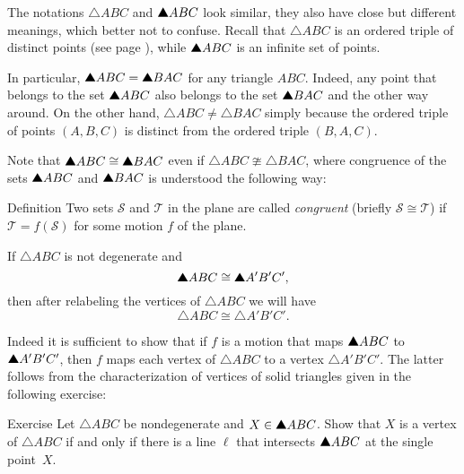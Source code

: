 

The notations $\triangle ABC$ and $\solidtriangle ABC$ look similar,
they also have close but different meanings, 
which better not to confuse.
Recall that $\triangle ABC$ is an ordered triple of distinct points
(see page \pageref{page:def:triangle}),
while $\solidtriangle ABC$ is an infinite set of points.

In particular, $\solidtriangle ABC=\solidtriangle BAC$ for any triangle $ABC$.
Indeed, any point that belongs to the set $\solidtriangle ABC$ 
also belongs to the set $\solidtriangle BAC$
and the other way around.
On the other hand,
$\triangle ABC\ne\triangle BAC$ simply because the ordered triple of points $(A,B,C)$ is distinct from the ordered triple $(B,A,C)$.

Note that $\solidtriangle ABC\cong\solidtriangle BAC$ even if $\triangle ABC\ncong\triangle BAC$, where congruence of the sets $\solidtriangle ABC$ and $\solidtriangle BAC$ 
is understood the following way:

\begin{thm}{Definition}\label{def:cong-sets}
Two sets $\mathcal{S}$ and $\mathcal{T}$ in the plane  
are called \emph{congruent} 
(briefly $\mathcal{S}\cong \mathcal{T}$)
if 
$\mathcal{T}=f(\mathcal{S})$ for some motion $f$ of the plane.
\end{thm}

If $\triangle ABC$ is not degenerate
and \[\solidtriangle ABC\cong \solidtriangle A'B'C',\]
then after relabeling the vertices of $\triangle ABC$ 
we will have 
\[\triangle ABC\cong \triangle A'B'C'.\]

Indeed it is sufficient to show that 
if $f$ is a motion that maps $\solidtriangle ABC$ to $\solidtriangle A'B'C'$,
then $f$ maps each vertex of $\triangle ABC$ to a vertex $\triangle A'B'C'$.
The latter follows from the characterization of vertices of solid triangles given in the following exercise:

\begin{thm}{Exercise}\label{ex:vertex}
Let $\triangle ABC$ be nondegenerate and $X\z\in \solidtriangle ABC$.
Show that $X$ is a vertex of $\triangle ABC$
if and only if there is a line $\ell$ that intersects $\solidtriangle ABC$
at the single point~$X$.
\end{thm}


